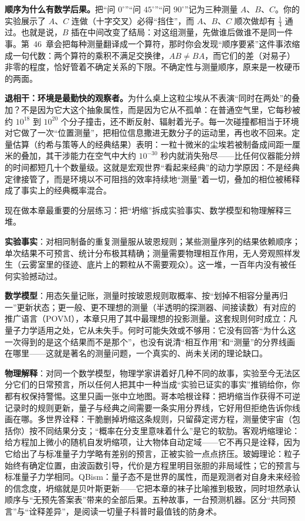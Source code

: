 \begin{challenge}
\textbf{顺序为什么有数学后果。}把“问 $0^\circ$”“问 $45^\circ$”“问 $90^\circ$”记为三种测量 $A$、$B$、$C$。你的实验展示了 $A$、$C$ 连做（十字交叉）必得“挡住”，而 $A$、$B$、$C$ 顺次做却有 $\tfrac14$ 通过。也就是说，$B$ 插在中间改变了结局：对这组测量，先做谁后做谁不是同一件事。第~46~章会把每种测量翻译成一个算符，那时你会发现“顺序要紧”这件事浓缩成一句代数：两个算符的乘积不满足交换律，$AB\neq BA$，而它们的差（对易子）非零的程度，恰好管着不确定关系的下限。不确定性与测量顺序，原来是一枚硬币的两面。

\textbf{退相干：环境是最勤快的观察者。}为什么桌上这粒尘埃从不表演“同时在两处”的叠加？不是因为它大这个抽象属性，而是因为它从不孤单：在普通空气里，它每秒被约 $10^{18}$ 到 $10^{20}$ 个分子撞击，还不断反射、辐射着光子。每一次碰撞都相当于环境对它做了一次“位置测量”，把相位信息撒进无数分子的运动里，再也收不回来。定量估算（约希与策等人的经典结果）表明：一粒十微米的尘埃若被制备成间距一厘米的叠加，其干涉能力在空气中大约 $10^{-30}$ 秒内就消失殆尽——比任何仪器能分辨的时间都短几十个数量级。这就是宏观世界“看起来经典”的动力学原因：不是经典定律接管了，而是环境以不可阻挡的效率持续地“测量”着一切，叠加的相位被稀释成了事实上的经典概率混合。
\end{challenge}


现在做本章最重要的分层练习：把“坍缩”拆成实验事实、数学模型和物理解释三堆。

\textbf{实验事实}：对相同制备的重复测量服从玻恩规则；某些测量序列的结果依赖顺序；单次结果不可预言、统计分布极其精确；测量需要物理相互作用，无人旁观照样发生（云雾室里的径迹、底片上的颗粒从不需要观众）。这一堆，一百年内没有被任何实验撼动过。

\textbf{数学模型}：用态矢量记账，测量时按玻恩规则取概率、按“划掉不相容分量再归一”更新状态；更一般、更不理想的测量（半透明的探测器、间接读数）有对应的推广语言（POVM），本章只用了其中最理想的投影测量。这套规则何时成立：凡量子力学适用之处，它从未失手。何时可能失效或不够用：它没有回答“为什么这一次得到的是这个结果而不是那个”，也没有说清“相互作用”和“测量”的分界线画在哪里——这就是著名的测量问题，一个真实的、尚未关闭的理论缺口。

\textbf{物理解释}：对同一个数学模型，物理学家讲着好几种不同的故事，实验至今无法区分它们的日常预言，所以任何人把其中一种当成“实验已证实的事实”推销给你，你都有权保持警惕。这里只画一张中立地图。哥本哈根诠释：把坍缩当作获得不可逆记录时的规则更新，量子与经典之间需要一条实用分界线，它好用但拒绝告诉你线画在哪。多世界诠释：干脆删掉坍缩这条规则，只留薛定谔方程，测量使宇宙（包括你）按不同结果分支；“概率在分支里意味着什么”是它的软肋。客观坍缩理论：给方程加上微小的随机自发坍缩项，让大物体自动定域——它不再只是诠释，因为它给出了与标准量子力学略有差别的预言，正被实验一点点挤压。玻姆理论：粒子始终有确定位置，由波函数引导，代价是方程里明目张胆的非局域性；它的预言与标准量子力学相同。QBism：量子态不是世界的属性，而是观测者对自身未来经验的信念度，坍缩就是贝叶斯更新——它把本章的袜子比喻推到极致，同时坦然承认顺序与“无预先答案表”带来的全部后果。五种故事，一台预测机器。区分“共同预言”与“诠释差异”，是阅读一切量子科普时最值钱的防身术。

